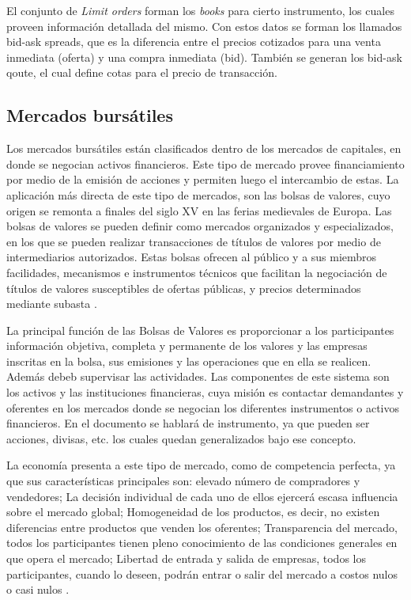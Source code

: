 El conjunto de \emph{Limit orders} forman los \emph{books} para cierto
instrumento, los cuales proveen información detallada del mismo. Con estos
datos se forman los llamados bid-ask spreads, que es la diferencia entre el
precios cotizados para una venta inmediata (oferta) y una compra inmediata
(bid).  También se generan los bid-ask qoute, el cual define cotas para el
precio de transacción.

\subsection{Mercados bursátiles}
Los mercados bursátiles están clasificados dentro de los mercados de capitales,
en donde se negocian activos financieros. Este tipo de mercado provee
financiamiento por medio de la emisión de acciones y permiten luego el
intercambio de estas. La aplicación más directa de este tipo de mercados, son
las bolsas de valores, cuyo origen se remonta a finales del siglo XV en las
ferias medievales de Europa. Las bolsas de valores se pueden definir como
mercados organizados y especializados, en los que se pueden realizar
transacciones de títulos de valores por medio de intermediarios autorizados.
Estas bolsas ofrecen al público y a sus miembros facilidades, mecanismos e
instrumentos técnicos que facilitan la negociación de títulos de valores
susceptibles de ofertas públicas, y precios determinados mediante subasta
\cite{levine1998stock}.

La principal función de las Bolsas de Valores es proporcionar a los
participantes información objetiva, completa y permanente de los valores y las
empresas inscritas en la bolsa, sus emisiones y las operaciones que en ella se
realicen. Además debeb supervisar las actividades. Las componentes de este
sistema son los activos y las instituciones financieras, cuya misión es
contactar demandantes y oferentes en los mercados donde se negocian los
diferentes instrumentos o activos financieros. En el documento se hablará de
instrumento, ya que pueden ser acciones, divisas, etc. los cuales quedan
generalizados bajo ese concepto.

La economía presenta a este tipo de mercado, como de competencia perfecta, ya
que sus características principales son: elevado número de compradores y
vendedores; La decisión individual de cada uno de ellos ejercerá escasa
influencia sobre el mercado global; Homogeneidad de los productos, es decir, no
existen diferencias entre productos que venden los oferentes; Transparencia del
mercado, todos los participantes tienen pleno conocimiento de las condiciones
generales en que opera el mercado; Libertad de entrada y salida de empresas,
todos los participantes, cuando lo deseen, podrán entrar o salir del mercado a
costos nulos o casi nulos \cite{mankiw2011principles}. 

